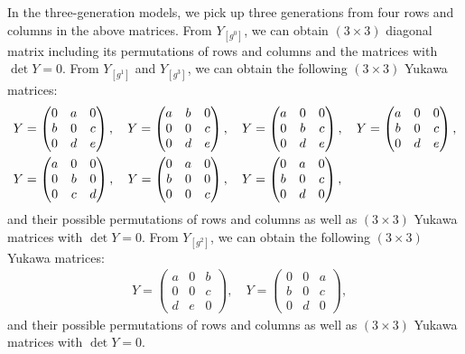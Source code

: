 \documentclass[a4paper,11pt]{article}
\numberwithin{equation}{section}
\begin{document}
In the three-generation models, we pick up three generations from four rows and columns in the above matrices.
From $Y_{[g^0]}$, we can obtain $(3 \times 3) $ diagonal matrix including its permutations of rows and columns and the matrices with $\det Y=0$.
From $Y_{[g^1]}$ and $Y_{[g^3]}$, 
we can obtain the following $(3 \times 3)$ Yukawa matrices:
\begin{align}
   & Y= \begin{pmatrix}
        0 & a & 0 \\
        b & 0 & c \\
        0 & d & e
    \end{pmatrix}, \quad
    Y=\begin{pmatrix}
        a & b & 0 \\
        0 & 0 & c \\
        0 & d & e
    \end{pmatrix}, \quad
    Y=\begin{pmatrix}
        a & 0 & 0 \\
        0 & b & c \\
        0 & d & e
    \end{pmatrix}, \quad
    Y=\begin{pmatrix}
        a & 0 & 0 \\
        b & 0 & c \\
        0 & d & e
    \end{pmatrix},  \notag \\
   & Y=\begin{pmatrix}
        a & 0 & 0 \\
        0 & b & 0 \\
        0 & c & d
    \end{pmatrix}, \quad
    Y=\begin{pmatrix}
        0 & a & 0 \\
        b & 0 & 0 \\
        0 & 0 & c
    \end{pmatrix}, \quad
    Y=\begin{pmatrix}
        0 & a & 0 \\
        b & 0 & c \\
        0 & d & 0
    \end{pmatrix},
\end{align}
and their possible permutations of rows and columns as well as $(3\times 3)$ Yukawa matrices with $\det Y=0$.
From $Y_{[g^2]}$, 
we can obtain the following $(3 \times 3)$ Yukawa matrices:
\begin{align}
   & Y= \begin{pmatrix}
        a & 0 & b \\
        0 & 0 & c \\
        d & e & 0
    \end{pmatrix}, \quad
    Y=\begin{pmatrix}
        0 & 0 & a \\
        b & 0 & c \\
        0 & d & 0
    \end{pmatrix},
\end{align}
and their possible permutations of rows and columns as well as $(3\times 3)$ Yukawa matrices with $\det Y=0$.
\end{document}

